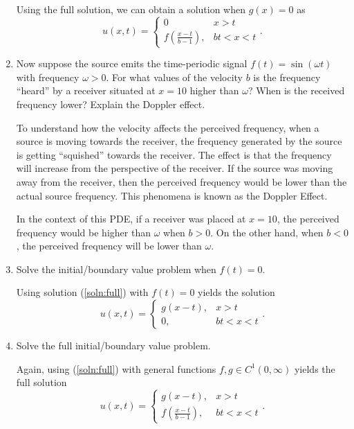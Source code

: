 \documentclass[a4paper,12pt]{article}
\begin{document}
\begin{enumerate}[label = \textbf{(\alph*)}]
        Using the full solution, we can obtain a solution when $ g(x) = 0 $ as
        \[
            u(x,t) = 
            \begin{cases}
                0 & x > t \\
                f(\frac{x - t}{b - 1}), & bt < x < t
            \end{cases}.
        \]
        
        \item Now suppose the source emits the time-periodic signal $ f(t) = \sin(\omega t) $ with frequency $ \omega > 0 $. For what values of the velocity $ b $ is the frequency ``heard'' by a receiver situated at $ x = 10 $ higher than $ \omega $? When is the received frequency lower? Explain the Doppler effect.
        
        To understand how the velocity affects the perceived frequency, when a source is moving towards the receiver, the frequency generated by the source is getting ``squished'' towards the receiver. The effect is that the frequency will increase from the perspective of the receiver. If the source was moving away from the receiver, then the perceived frequency would be lower than the actual source frequency. This phenomena is known as the Doppler Effect.
        
        In the context of this PDE, if a receiver was placed at $ x = 10 $, the perceived frequency would be higher than $ \omega $ when $ b > 0 $. On the other hand, when $ b < 0 $, the perceived frequency will be lower than $ \omega $.
        
        \item Solve the initial/boundary value problem when $ f(t) = 0 $.
        
        Using solution (\ref{soln:full}) with $ f(t) = 0 $ yields the solution
        \[
            u(x,t) = 
            \begin{cases}
                g(x - t), & x > t \\
                0, & bt < x < t
            \end{cases}.
        \]
        
        \item Solve the full initial/boundary value problem.
        
        Again, using (\ref{soln:full}) with general functions $ f,g \in C^1(0, \infty) $ yields the full solution
        \[
            u(x,t) = 
                \begin{cases}
                    g(x - t), & x > t \\
                    f(\frac{x - t}{b - 1}), & bt < x < t
                \end{cases}.
        \]
        

\end{enumerate}
\end{document}
